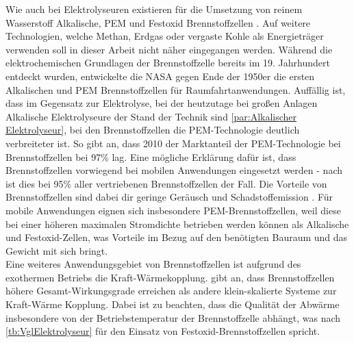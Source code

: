 Wie auch bei Elektrolyseuren existieren für die Umsetzung von reinem Wasserstoff Alkalische, PEM und Festoxid Brennstoffzellen \citep{lucia_overview_2014}. Auf weitere Technologien, welche Methan, Erdgas oder vergaste Kohle als Energieträger verwenden soll in dieser Arbeit nicht näher eingegangen werden. Während die elektrochemischen Grundlagen der Brennstoffzelle bereits im 19. Jahrhundert entdeckt wurden, entwickelte die NASA   gegen Ende der 1950er die ersten Alkalischen und PEM Brennstoffzellen für Raumfahrtanwendungen. Auffällig ist, dass im Gegensatz zur Elektrolyse, bei der heutzutage bei großen Anlagen Alkalische Elektrolyseure der Stand der Technik sind \ref{par:Alkalischer Elektrolyseur}, bei den Brennstoffzellen die PEM-Technologie deutlich verbreiteter ist. So gibt \citet{lucia_overview_2014} an, dass 2010  der Marktanteil der PEM-Technologie bei Brennstoffzellen bei 97\% lag. Eine mögliche Erklärung dafür ist, dass Brennstoffzellen vorwiegend bei mobilen Anwendungen eingesetzt werden - nach \citet{lucia_overview_2014} ist dies bei 95\% aller vertriebenen Brennstoffzellen der Fall. Die Vorteile von Brennstoffzellen sind dabei dir geringe Geräusch und Schadstoffemission \citep{olabi_prospects_2020}. Für mobile Anwendungen eignen sich insbesondere PEM-Brennstoffzellen, weil diese bei einer höheren maximalen Stromdichte betrieben werden können als Alkalische und Festoxid-Zellen, was Vorteile im Bezug auf den benötigten Bauraum und das Gewicht mit sich bringt.\\ 
Eine weiteres Anwendungsgebiet von Brennstoffzellen ist aufgrund des exothermen Betriebs die Kraft-Wärmekopplung. \citet{olabi_prospects_2020} gibt an, dass Brennstoffzellen höhere Gesamt-Wirkungsgrade erreichen als andere klein-skalierte Systeme zur Kraft-Wärme Kopplung. Dabei ist zu beachten, dass die Qualität der Abwärme insbesondere von der Betriebstemperatur der Brennstoffzelle abhängt, was nach \ref{tb:VglElektrolyseur} für den Einsatz von Festoxid-Brennstoffzellen spricht.\\ 

